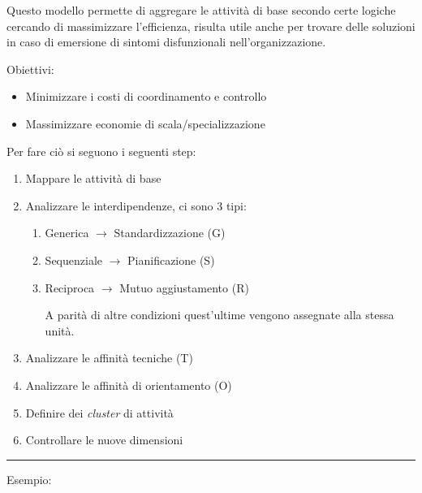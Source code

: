 \documentclass{article}
\begin{document}
Questo modello permette di aggregare le attività di base secondo certe logiche cercando di massimizzare l'efficienza, risulta utile anche per trovare delle soluzioni in caso di emersione di sintomi disfunzionali nell'organizzazione.\newline

\noindent Obiettivi:
\begin{itemize}
    \item Minimizzare i costi di coordinamento e controllo
    \item Massimizzare economie di scala/specializzazione\newline
\end{itemize}

\noindent Per fare ciò si seguono i seguenti step:
\begin{enumerate}
    \item Mappare le attività di base
    \item Analizzare le interdipendenze, ci sono 3 tipi:
        \begin{enumerate}
            \item Generica $\rightarrow$ Standardizzazione (G)
            \item Sequenziale $\rightarrow$ Pianificazione (S)
            \item Reciproca $\rightarrow$ Mutuo aggiustamento (R)

                A parità di altre condizioni quest'ultime vengono assegnate alla stessa unità.
            
        \end{enumerate}
    \item Analizzare le affinità tecniche (T)
    \item Analizzare le affinità di orientamento (O)    
    \item Definire dei \textit{cluster} di attività
    \item Controllare le nuove dimensioni\newline
\end{enumerate}

\noindent\rule{\textwidth}{0.5pt}\newline
Esempio:
\end{document}
